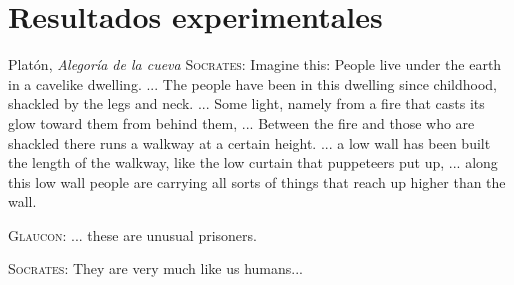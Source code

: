 \chapter{Resultados experimentales}

\begin{chapquote}{Platón, \textit{Alegoría de la cueva}}
\textsc{Socrates}: Imagine this: People live under the earth in a cavelike dwelling. ... The people have been in this dwelling since childhood, shackled by the legs and neck. ... Some light, namely from a fire that casts its glow toward them from behind them, ... Between the fire and those who are shackled there runs a walkway at a certain height. ... a low wall has been built the length of the walkway, like the low curtain that puppeteers put up, ... along this low wall people are carrying all sorts of things that reach up higher than the wall.


\textsc{Glaucon}: ... these are unusual prisoners.

\textsc{Socrates}: They are very much like us humans...
\end{chapquote}

\lipsum[1-2]
